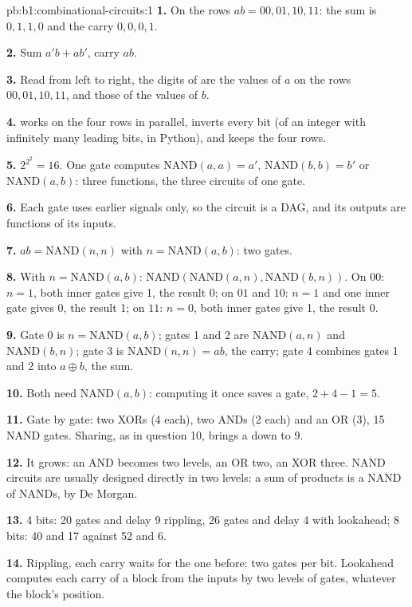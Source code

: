 \begin{solution}{pb:b1:combinational-circuits:1}
\textbf{1.} On the rows $ab = 00, 01, 10, 11$: the sum is $0, 1, 1, 0$ and the carry $0, 0, 0, 1$.

\textbf{2.} Sum $a'b + ab'$, carry $ab$.

\textbf{3.} Read from left to right, the digits of  are the values of $a$ on the rows $00, 01, 10, 11$, and
those of  the values of $b$.

\textbf{4.} \code{&} works on the four rows in parallel, \code{\textasciitilde} inverts every bit (of an integer with
infinitely many leading bits, in Python), and  keeps the four rows.

\textbf{5.} $2^{2^2} = 16$. One gate computes $\text{NAND}(a, a) = a'$, $\text{NAND}(b, b) = b'$ or $\text{NAND}(a, b)$:
three functions, the three circuits of one gate.

\textbf{6.} Each gate uses earlier signals only, so the circuit is a DAG, and its outputs are functions of its inputs.

\textbf{7.} $ab = \text{NAND}(n, n)$ with $n = \text{NAND}(a, b)$: two gates.

\textbf{8.} With $n = \text{NAND}(a, b)$: $\text{NAND}(\text{NAND}(a, n), \text{NAND}(b, n))$. On $00$: $n = 1$, both inner
gates give 1, the result 0; on $01$ and $10$: $n = 1$ and one inner gate gives 0, the result 1; on $11$: $n = 0$, both
inner gates give 1, the result 0.

\textbf{9.} Gate 0 is $n = \text{NAND}(a, b)$; gates 1 and 2 are $\text{NAND}(a, n)$ and $\text{NAND}(b, n)$; gate 3 is
$\text{NAND}(n, n) = ab$, the carry; gate 4 combines gates 1 and 2 into $a \oplus b$, the sum.

\textbf{10.} Both need $\text{NAND}(a, b)$: computing it once saves a gate, $2 + 4 - 1 = 5$.

\textbf{11.} Gate by gate: two XORs (4 each), two ANDs (2 each) and an OR (3), 15 NAND gates. Sharing, as in question 10,
brings a  down to 9.

\textbf{12.} It grows: an AND becomes two levels, an OR two, an XOR three. NAND circuits are usually designed directly in
two levels: a sum of products is a NAND of NANDs, by De Morgan.

\textbf{13.} 4 bits: 20 gates and delay 9 rippling, 26 gates and delay 4 with lookahead; 8 bits: 40 and 17 against 52 and 6.

\textbf{14.} Rippling, each carry waits for the one before: two gates per bit. Lookahead computes each carry of a block
from the inputs by two levels of gates, whatever the block's position.


\end{solution}
